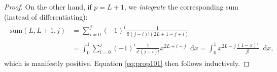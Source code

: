 \documentclass[11pt,english]{article}
\numberwithin{equation}{section}
\theoremstyle{remark}
\theoremstyle{plain}
\theoremstyle{remark}
\newcommand{\dd}{\mathop{}\!\mathrm{d}}
\renewcommand{\(}{\left(}
\renewcommand{\)}{\right)}
\begin{document}
\begin{proof}
On the other hand, if $p=L+1$, we \textit{integrate} the corresponding sum (instead of differentiating):
\begin{align}
\begin{split}
\mathrm{sum}(L,L+1,j)&=\sum_{i=0}^j (-1)^i\frac{1}{i!(j-i)!(2L+1-j+i)}\\
&=\int_0^1\sum_{i=0}^j  (-1)^i\frac{1}{i!(j-i)!}x^{2L+i-j}\dd x =\int_0^1 x^{2L-j}\frac{(1-x)^j}{j!}\dd x,
\end{split}
\end{align}
which is manifestly positive. Equation \eqref{eq:prop101} then follows inductively.
\end{proof}

\small{ 
}
\end{document}
